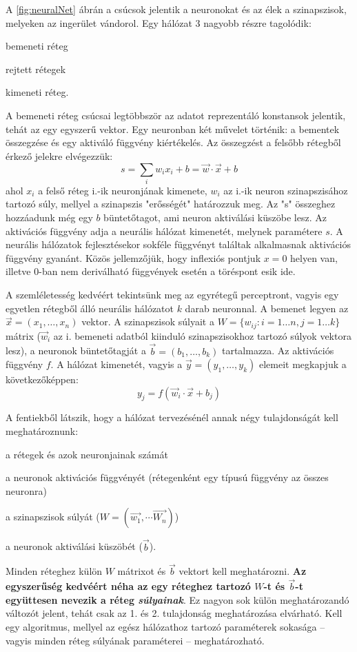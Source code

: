 A \ref{fig:neuralNet} ábrán a csúcsok jelentik a neuronokat és az élek a szinapszisok, melyeken az ingerület vándorol. Egy hálózat 3 nagyobb részre tagolódik:
\begin{enumerate*}[label={\alph*)},font=\bfseries]
	\item bemeneti réteg
	\item rejtett rétegek
	\item kimeneti réteg.
\end{enumerate*}
A bemeneti réteg csúcsai legtöbbször az adatot reprezentáló konstansok jelentik, tehát az egy egyszerű vektor.
Egy neuronban két művelet történik: a bementek összegzése és egy aktiváló függvény kiértékelés. Az összegzést a felsőbb rétegből érkező jelekre elvégezzük:
\begin{displaymath}
	s = \sum_i{w_ix_i}+b = \vec{w}\cdot\vec{x} + b
\end{displaymath}
ahol $x_i$ a felső réteg i.-ik neuronjának kimenete, $w_i$ az i.-ik neuron szinapszisához tartozó súly, mellyel a szinapszis "erősségét" határozzuk meg. Az "s" összeghez hozzáadunk még egy $b$  büntetőtagot, ami neuron aktiválási küszöbe lesz.
Az aktivációs függvény adja a neurális hálózat kimenetét, melynek paramétere $s$.
A neurális hálózatok fejlesztésekor sokféle függvényt találtak alkalmasnak aktivációs függvény gyanánt. Közös jellemzőjük, hogy inflexiós pontjuk $x=0$ helyen van, illetve 0-ban nem deriválható függvények esetén a töréspont esik ide.

A szemléletesség kedvéért tekintsünk meg az egyrétegű perceptront, vagyis egy egyetlen rétegből álló neurális hálózatot $k$ darab neuronnal. A bemenet legyen az $\vec{x}=(x_1,\dots,x_n)$ vektor. A szinapszisok súlyait a $W=\{w_{ij}:i=1\dots n,j=1\dots k\}$  mátrix ($\vec{w}_i$ az i. bemeneti adatból kiinduló szinapszisokhoz tartozó súlyok vektora lesz), a neuronok  büntetőtagját a $\vec{b}=(b_1,\dots,b_k)$ tartalmazza. Az aktivációs függvény $f$. A hálózat kimenetét, vagyis a  $\vec{y}=(y_1,\dots,y_k)$ elemeit megkapjuk a következőképpen:
\begin{displaymath}
	y_j = f(\vec{w}_i\cdot\vec{x}+b_j)
\end{displaymath}

A fentiekből látszik, hogy a hálózat tervezésénél annak négy tulajdonságát kell meghatároznunk:
\begin{enumerate*}
	\item a rétegek és azok neuronjainak számát
	\item a neuronok aktivációs függvényét (rétegenként egy típusú függvény az összes neuronra)
	\item a szinapszisok súlyát ($W=(\vec{w_1},\cdots\vec{W_n})$)
	\item a neuronok aktiválási küszöbét ($\vec{b}$).
\end{enumerate*}
Minden réteghez külön $W$ mátrixot és $\vec{b}$ vektort kell meghatározni. \textbf{Az egyszerűség kedvéért néha az egy réteghez tartozó $W$-t és $\vec{b}$-t együttesen nevezik a réteg \emph{súlyainak}}. Ez nagyon sok külön meghatározandó változót jelent, tehát csak az 1. és 2. tulajdonság meghatározása elvárható. Kell egy algoritmus, mellyel az egész hálózathoz tartozó paraméterek sokasága -- vagyis minden réteg súlyának paraméterei -- meghatározható.


